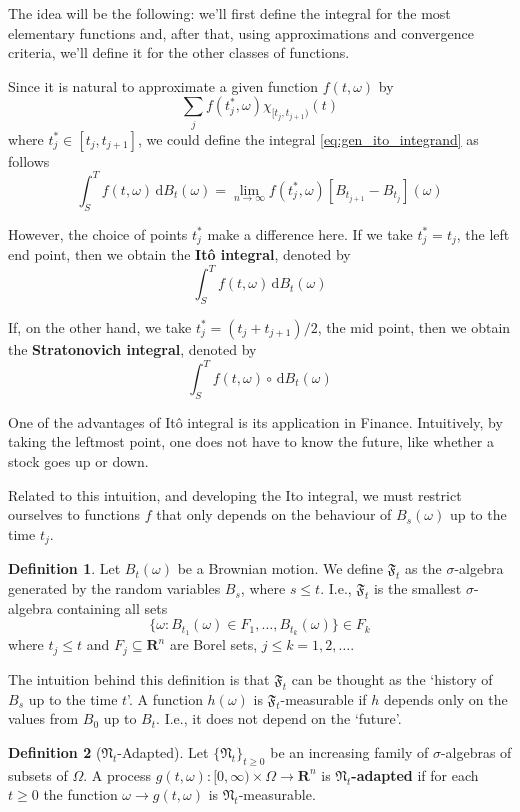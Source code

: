 \documentclass[12pt,a4paper]{article}
\theoremstyle{definition}
\newtheorem{definition}{Definition}[section]
\begin{document}
The idea will be the following: we'll first define the integral for the most elementary functions and, after that, using approximations and convergence criteria, we'll define it for the other classes of functions.

Since it is natural to approximate a given function $f(t, \omega)$ by
\[
	\sum_j f(t_j^\ast, \omega) \chi_{[t_j, t_{j+1})}(t)
\]
where $t_j^\ast \in [t_j, t_{j+1}]$, we could define the integral \eqref{eq:gen_ito_integrand} as follows
\[
	\int_S^T f(t, \omega) \, \mathrm{d}B_t(\omega) = \lim_{n \to \infty} f(t_j^\ast,\omega) [B_{t_{j+1}} - B_{t_j}](\omega)
\]

However, the choice of points $t_j^\ast$ make a difference here. If we take $t_j^\ast = t_j$, the left end point, then we obtain the \textbf{Itô integral}, denoted by
\[
	\int_S^T f(t, \omega) \, \mathrm{d}B_t(\omega)
\]

If, on the other hand, we take $t_j^\ast = (t_j + t_{j+1})/2$, the mid point, then we obtain the \textbf{Stratonovich integral}, denoted by
\[
	\int_S^T f(t, \omega) \circ \, \mathrm{d}B_t(\omega)
\]

One of the advantages of Itô integral is its application in Finance. Intuitively, by taking the leftmost point, one does not have to know the future, like whether a stock goes up or down.

Related to this intuition, and developing the Ito integral, we must restrict ourselves to functions $f$ that only depends on the behaviour of $B_s(\omega)$ up to the time $t_j$. 

\begin{definition}
	Let $B_t(\omega)$ be a Brownian motion. We define $\mathfrak{F}_t$ as the $\sigma$-algebra generated by the random variables $B_s$, where $s \leq t$. I.e., $\mathfrak{F}_t$ is the smallest $\sigma$-algebra containing all sets
	\[
		\{ \omega : B_{t_1}(\omega) \in F_1, \ldots, B_{t_k}(\omega) \} \in F_k
	\]
	where $t_j \leq t$ and $F_j \subseteq \textbf{R}^n$ are Borel sets, $j \leq k = 1, 2, \ldots$.
\end{definition}

The intuition behind this definition is that $\mathfrak{F}_t$ can be thought as the `history of $B_s$ up to the time $t$'. A function $h(\omega)$ is $\mathfrak{F}_t$-measurable if $h$ depends only on the values from $B_0$ up to $B_t$. I.e., it does not depend on the `future'. 

\begin{definition}[$\mathfrak{N}_t$-Adapted]
	Let $\{ \mathfrak{N}_t \}_{t \geq 0}$ be an increasing family of $\sigma$-algebras of subsets of $\Omega$. A process $g(t,\omega) : [0, \infty) \times \Omega \longrightarrow \textbf{R}^n$ is \textbf{$\mathfrak{N}_t$-adapted} if for each $t \geq 0$ the function $\omega \longrightarrow g(t,\omega)$ is $\mathfrak{N}_t$-measurable.
\end{definition}
\end{document}
